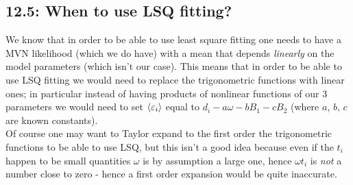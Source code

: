 \documentclass[a4paper]{article}
\begin{document}
\subsection{12.5: When to use LSQ fitting?}
We know that in order to be able to use least square fitting one needs to have a MVN likelihood (which we do have) with a mean that depends \emph{linearly} on the model parameters (which isn't our case). This means that in order to be able to use LSQ fitting we would need to replace the trigonometric functions with linear ones; in particular instead of having products of nonlinear functions of our 3 parameters we would need to set $\expval{\varepsilon_i}$ equal to $d_i - a\omega -b B_1 -c B_2$ (where $a$, $b$, $c$ are known constants).\\
Of course one may want to Taylor expand to the first order the trigonometric functions to be able to use LSQ, but this isn't a good idea because even if the $t_i$ happen to be small quantities $\omega$ is by assumption a large one, hence $\omega t_i$ is \emph{not} a number close to zero - hence a first order expansion would be quite inaccurate.
\end{document}

